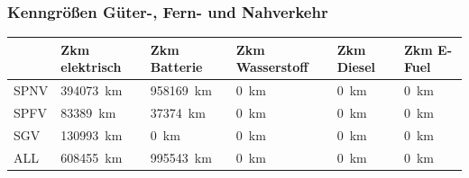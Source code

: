 \subsubsection{Kenngrößen Güter-, Fern- und Nahverkehr}
\begin{center}
\begin{tabularx}{\textwidth}{l|X|X|X|X|X} & Zkm elektrisch & Zkm Batterie & Zkm Wasserstoff & Zkm Diesel & Zkm E-Fuel \\
	\hline
	\uppercase{spnv} &
	\SI{394073}{\km} &
	\SI{958169}{\km} &
	\SI{0}{\km} &
	\SI{0}{\km} &
	\SI{0}{\km} \\
	\uppercase{spfv} &
	\SI{83389}{\km} &
	\SI{37374}{\km} &
	\SI{0}{\km} &
	\SI{0}{\km} &
	\SI{0}{\km} \\
	\uppercase{sgv} &
	\SI{130993}{\km} &
	\SI{0}{\km} &
	\SI{0}{\km} &
	\SI{0}{\km} &
	\SI{0}{\km} \\
	\uppercase{all} &
	\SI{608455}{\km} &
	\SI{995543}{\km} &
	\SI{0}{\km} &
	\SI{0}{\km} &
	\SI{0}{\km} \\
\end{tabularx}
\end{center}


